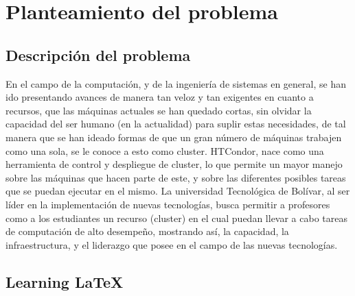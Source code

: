 
\chapter{Planteamiento del problema} %

\label{Chapter1} %


\newcommand{\keyword}[1]{\textbf{#1}}
\newcommand{\tabhead}[1]{\textbf{#1}}
\newcommand{\code}[1]{\texttt{#1}}
\newcommand{\file}[1]{\texttt{\bfseries#1}}
\newcommand{\option}[1]{\texttt{\itshape#1}}


\section{Descripción del problema}
En el campo de la computación, y de la ingeniería de sistemas en general, se han ido presentando avances de manera tan veloz y tan exigentes en cuanto a recursos, que las máquinas actuales se han quedado cortas, sin olvidar la capacidad del ser humano (en la actualidad) para suplir estas necesidades, de tal manera que se han ideado formas de que un gran número de máquinas trabajen como una sola, se le conoce a esto como cluster. HTCondor, nace como una herramienta de control y despliegue de cluster, lo que permite un mayor manejo sobre las máquinas que hacen parte de este, y sobre las diferentes posibles tareas que se puedan ejecutar en el mismo. La universidad Tecnológica de Bolívar, al ser líder en la implementación de nuevas tecnologías, busca permitir a profesores como a los estudiantes un recurso (cluster) en el cual puedan llevar a cabo tareas de computación de alto desempeño, mostrando así, la capacidad, la infraestructura, y el liderazgo que posee en el campo de las nuevas tecnologías.\\


\section{Learning \LaTeX{}}


